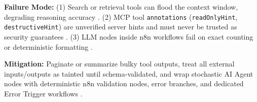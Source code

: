 \documentclass[../../../../master.tex]{subfiles}
\begin{document}
\begin{pitfall}
\textbf{Failure Mode:} (1) Search or retrieval tools can flood the context window, degrading reasoning accuracy . (2) MCP tool \texttt{annotations} (\texttt{readOnlyHint}, \texttt{destructiveHint}) are unverified server hints and must never be trusted as security guarantees . (3) LLM nodes inside n8n workflows fail on exact counting or deterministic formatting .

\textbf{Mitigation:} Paginate or summarize bulky tool outputs, treat all external inputs/outputs as tainted until schema-validated, and wrap stochastic AI Agent nodes with deterministic n8n validation nodes, error branches, and dedicated Error Trigger workflows .
\end{pitfall}
\end{document}
